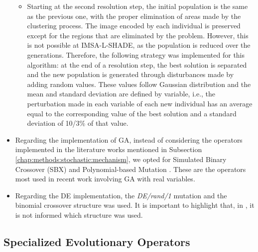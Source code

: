 \begin{itemize}
\begin{itemize}
					\item Starting at the second resolution step, the initial population is the same as the previous one, with the proper elimination of areas made by the clustering process. The image encoded by each individual is preserved except for the regions that are eliminated by the problem. However, this is not possible at IMSA-L-SHADE, as the population is reduced over the generations. Therefore, the following strategy was implemented for this algorithm: at the end of a resolution step, the best solution is separated and the new population is generated through disturbances made by adding random values. These values follow Gaussian distribution and the mean and standard deviation are defined by variable, i.e., the perturbation made in each variable of each new individual has an average equal to the corresponding value of the best solution and a standard deviation of 10/3\% of that value.
				\end{itemize}				
				\item Regarding the implementation of GA, instead of considering the operators implemented in the literature works mentioned in Subsection \ref{chap:methods:stochastic:mechanism}, we opted for Simulated Binary Crossover (SBX) and Polynomial-based Mutation \citep{lin2016hybrid}. These are the operators most used in recent work involving GA with real variables.
				\item Regarding the DE implementation, the \textit{DE/rand/1} mutation and the binomial crossover structure was used. It is important to highlight that, in \citep{donelli2010differential}, it is not informed which structure was used.
			\end{itemize}
		
		\subsection{Specialized Evolutionary Operators}\label{chap:investigation:proposal:operators}
		
